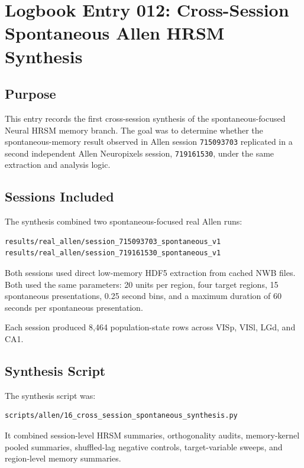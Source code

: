 \section{Logbook Entry 012: Cross-Session Spontaneous Allen HRSM Synthesis}
\label{sec:logbook-entry-012-cross-session-spontaneous-allen}

\subsection{Purpose}

This entry records the first cross-session synthesis of the spontaneous-focused Neural HRSM memory branch. The goal was to determine whether the spontaneous-memory result observed in Allen session \texttt{715093703} replicated in a second independent Allen Neuropixels session, \texttt{719161530}, under the same extraction and analysis logic.

\subsection{Sessions Included}

The synthesis combined two spontaneous-focused real Allen runs:

\begin{verbatim}
results/real_allen/session_715093703_spontaneous_v1
results/real_allen/session_719161530_spontaneous_v1
\end{verbatim}

Both sessions used direct low-memory HDF5 extraction from cached NWB files. Both used the same parameters: 20 units per region, four target regions, 15 spontaneous presentations, 0.25 second bins, and a maximum duration of 60 seconds per spontaneous presentation.

Each session produced 8,464 population-state rows across VISp, VISl, LGd, and CA1.

\subsection{Synthesis Script}

The synthesis script was:

\begin{verbatim}
scripts/allen/16_cross_session_spontaneous_synthesis.py
\end{verbatim}

It combined session-level HRSM summaries, orthogonality audits, memory-kernel pooled summaries, shuffled-lag negative controls, target-variable sweeps, and region-level memory summaries.

